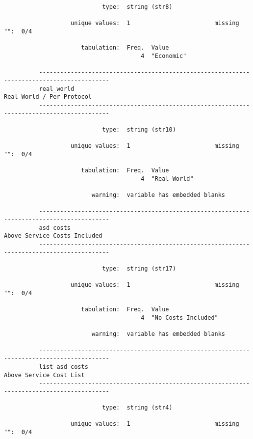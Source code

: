 \documentclass{article}
\begin{document}
\begin{verbatim}
                            type:  string (str8)
          
                   unique values:  1                        missing "":  0/4
          
                      tabulation:  Freq.  Value
                                       4  "Economic"
          
          ------------------------------------------------------------------------------------------
          real_world                                                       Real World / Per Protocol
          ------------------------------------------------------------------------------------------
          
                            type:  string (str10)
          
                   unique values:  1                        missing "":  0/4
          
                      tabulation:  Freq.  Value
                                       4  "Real World"
          
                         warning:  variable has embedded blanks
          
          ------------------------------------------------------------------------------------------
          asd_costs                                                     Above Service Costs Included
          ------------------------------------------------------------------------------------------
          
                            type:  string (str17)
          
                   unique values:  1                        missing "":  0/4
          
                      tabulation:  Freq.  Value
                                       4  "No Costs Included"
          
                         warning:  variable has embedded blanks
          
          ------------------------------------------------------------------------------------------
          list_asd_costs                                                     Above Service Cost List
          ------------------------------------------------------------------------------------------
          
                            type:  string (str4)
          
                   unique values:  1                        missing "":  0/4
          

\end{verbatim}
\end{document}
